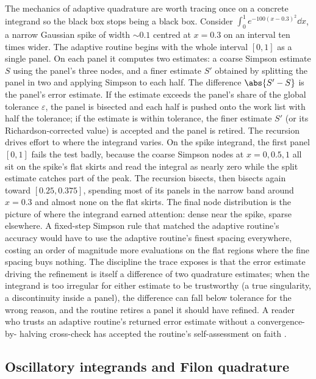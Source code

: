 The mechanics of adaptive quadrature are worth tracing once on a
concrete integrand so the black box stops being a black box. Consider
$\int_{0}^{1} e^{-100(x - 0.3)^{2}}\dd x$, a narrow Gaussian spike of
width $\sim 0.1$ centred at $x = 0.3$ on an interval ten times wider.
The adaptive routine begins with the whole interval $[0, 1]$ as a
single panel. On each panel it computes two estimates: a coarse
Simpson estimate $S$ using the panel's three nodes, and a finer
estimate $S'$ obtained by splitting the panel in two and applying
Simpson to each half. The difference $\abs{S' - S}$ is the panel's
error estimate. If the estimate exceeds the panel's share of the
global tolerance $\varepsilon$, the panel is bisected and each half is
pushed onto the work list with half the tolerance; if the estimate is
within tolerance, the finer estimate $S'$ (or its Richardson-corrected
value) is accepted and the panel is retired. The recursion drives
effort to where the integrand varies. On the spike integrand, the
first panel $[0, 1]$ fails the test badly, because the coarse Simpson
nodes at $x = 0, 0.5, 1$ all sit on the spike's flat skirts and read
the integral as nearly zero while the split estimate catches part of
the peak. The recursion bisects, then bisects again toward $[0.25,
0.375]$, spending most of its panels in the narrow band around $x =
0.3$ and almost none on the flat skirts. The final node distribution
is the picture of where the integrand earned attention: dense near the
spike, sparse elsewhere. A fixed-step Simpson rule that matched the
adaptive routine's accuracy would have to use the adaptive routine's
finest spacing everywhere, costing an order of magnitude more
evaluations on the flat regions where the fine spacing buys nothing.
The discipline the trace exposes is that the error estimate driving
the refinement is itself a difference of two quadrature estimates;
when the integrand is too irregular for either estimate to be
trustworthy (a true singularity, a discontinuity inside a panel), the
difference can fall below tolerance for the wrong reason, and the
routine retires a panel it should have refined. A reader who trusts an
adaptive routine's returned error estimate without a convergence-by-
halving cross-check has accepted the routine's self-assessment on
faith \cite{text:v2ch06-burden-faires-numerical}.

\subsection{Oscillatory integrands and Filon quadrature}

